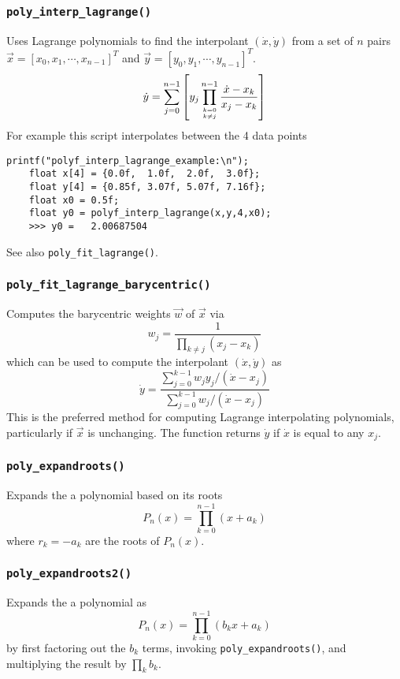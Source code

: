 \subsubsection{{\tt poly\_interp\_lagrange()}}
Uses Lagrange polynomials to find the interpolant
$(\dot{x},\dot{y})$ from a set of $n$ pairs
$\vec{x}=[x_0,x_1,\cdots,x_{n-1}]^T$ and 
$\vec{y}=[y_0,y_1,\cdots,y_{n-1}]^T$.
\[
    \dot{y} =
        \sum_{j=0}^{n-1} {
            \left[
            y_j
            \prod_{{k=0}\atop{k \ne j}}^{n-1} {
                \frac{\dot{x}-x_k}{x_j-x_k}
            }
            \right]
        }
\]
%
For example this script interpolates between the 4 data points
%
\begin{Verbatim}[fontsize=\small]
    printf("polyf_interp_lagrange_example:\n");
    float x[4] = {0.0f,  1.0f,  2.0f,  3.0f};
    float y[4] = {0.85f, 3.07f, 5.07f, 7.16f};
    float x0 = 0.5f;
    float y0 = polyf_interp_lagrange(x,y,4,x0);
    >>> y0 =   2.00687504
\end{Verbatim}
%
See also {\tt poly\_fit\_lagrange()}.

\subsubsection{{\tt poly\_fit\_lagrange\_barycentric()}}
Computes the barycentric weights $\vec{w}$ of $\vec{x}$ via
\[
    w_j =   \frac{1}{
                \prod_{k \ne j}{\left(x_j - x_k\right)}
            }
\]
which can be used to compute the interpolant $(\dot{x},\dot{y})$ as
\[
    \dot{y} =   \frac{
                    \sum\limits_{j=0}^{k-1}{ w_j y_j /(\dot{x}-x_j) }
                } {
                    \sum\limits_{j=0}^{k-1}{     w_j /(\dot{x}-x_j) }
                }
\]
This is the preferred method for computing Lagrange interpolating polynomials,
particularly if $\vec{x}$ is unchanging.
The function returns $\dot{y}$ if $\dot{x}$ is equal to any $x_j$.

\subsubsection{{\tt poly\_expandroots()}}
Expands the a polynomial based on its roots
\[
    P_n(x) = \prod_{k=0}^{n-1}{(x+a_k)}
\]
where $r_k=-a_k$ are the roots of $P_n(x)$.

\subsubsection{{\tt poly\_expandroots2()}}
Expands the a polynomial as
\[
    P_n(x) = \prod_{k=0}^{n-1}{(b_kx+a_k)}
\]
by first factoring out the $b_k$ terms,
invoking {\tt poly\_expandroots()}, and
multiplying the result by $\prod_k{b_k}$.

